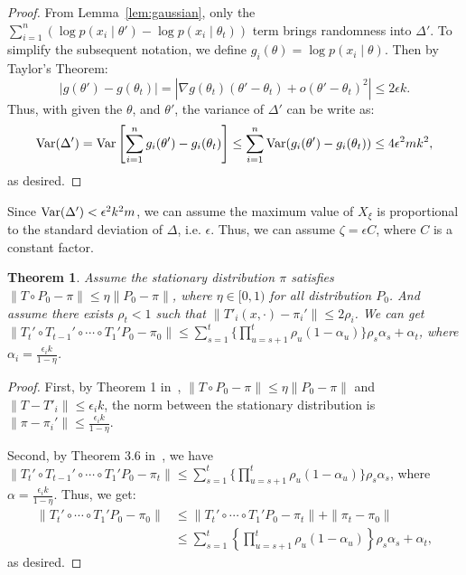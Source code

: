 \documentclass{article}
\newtheorem{theorem}{Theorem}
\begin{document}
\begin{proof}
From Lemma~\ref{lem:gaussian}, only the $\sum_{i=1}^n (\log p(x_i\mid \theta') - \log p(x_i\mid
\theta_t))$ term brings randomness into $\Delta'$. To simplify the subsequent notation, we define
$g_i(\theta) = \log p(x_i\mid \theta)$. Then by Taylor's Theorem:
\[
|g(\theta') - g(\theta_t)| = |\nabla g(\theta_t) (\theta' - \theta_t) + o(\theta' - \theta_t)^2| \leq 2\epsilon k.
\]
Thus, with given the $\theta$, and $\theta'$, the variance of $\Delta'$ can be write as:
\[
{\rm Var}(\Delta') = {\rm Var}\left[\sum_{i=1}^n g_i(\theta') - g_i(\theta_t)\right] \leq
\sum_{i=1}^n {\rm Var}(g_i(\theta') - g_i(\theta_t)) \leq  4\epsilon^2 m k^2,
\]
as desired.
\end{proof}

Since ${\rm Var}(\Delta') < \epsilon^2 k^2 m$, we can assume the maximum value of $X_{\xi}$ is
proportional to the standard deviation of $\Delta$, i.e. $\epsilon$. Thus, we can assume
$\zeta=\epsilon C$, where $C$ is a constant factor.

\begin{theorem}
Assume the stationary distribution $\pi$ satisfies $\|T \circ P_0 - \pi\| \leq \eta \|P_0 - \pi\|$,
where $\eta \in [0, 1)$ for all distribution $P_0$. And assume there exists $\rho_t < 1$ such that
$\|T'_i(x, \cdot) - \pi_i'\| \leq 2\rho_i$. We can get $\| T_t' \circ T_{t-1}' \circ \cdots \circ T_1' P_0
- \pi_0 \| \leq \sum_{s=1}^t \{\prod _{u=s+1}^t \rho_u (1-\alpha_u)\} \rho_s \alpha_s + \alpha_t $,
where $\alpha_i = \frac{\epsilon_i k }{1-\eta}$.
\end{theorem}

\begin{proof}
First, by Theorem 1 in~\cite{cutting_mh_2014}, $\|T \circ P_0 - \pi\| \leq \eta \|P_0
- \pi\|$ and $\|T-T'_i\| \leq \epsilon_i k$, the norm between the stationary distribution is $\|\pi
- \pi_i'\|\leq \frac{\epsilon_i k}{1-\eta}$.

Second, by Theorem 3.6 in~\cite{yang2013sequential}, we have  $\| T_t' \circ T_{t-1}' \circ \cdots
\circ T_1' P_0 - \pi_t \| \leq \sum_{s=1}^t \{\prod _{u=s+1}^t \rho_u (1-\alpha_u)\} \rho_s
\alpha_s$, where $\alpha = \frac{\epsilon_i k}{1-\eta}$. Thus, we get:
\begin{align*}
 \| T_t' \circ \cdots \circ T_1' P_0 - \pi_0 \| &\leq \|T_t' \circ \cdots \circ T_1' P_0 - \pi_t\| + \|\pi_t - \pi_0\| \\
 &\leq \sum_{s=1}^t \left\{\prod _{u=s+1}^t \rho_u (1-\alpha_u)\right\} \rho_s \alpha_s + \alpha_t,
\end{align*}
as desired.
\end{proof}
\end{document}
